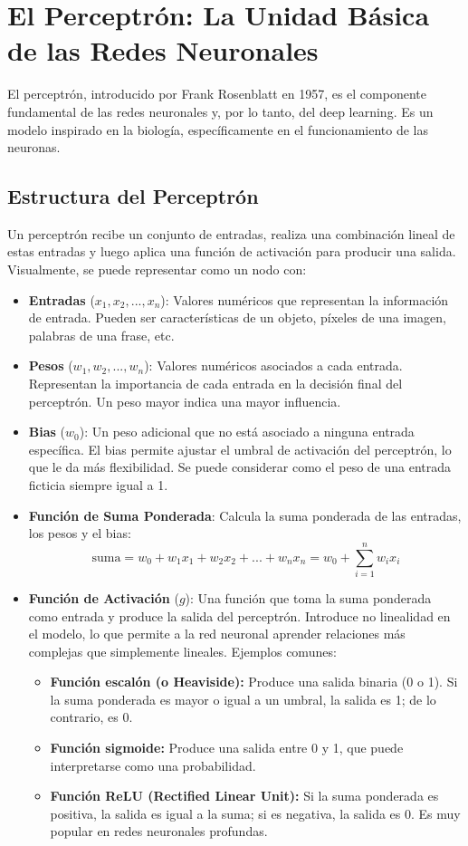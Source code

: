\documentclass{article}
\begin{document}
\section{El Perceptrón: La Unidad Básica de las Redes Neuronales}

El perceptrón, introducido por Frank Rosenblatt en 1957, es el componente fundamental de las redes neuronales y, por lo tanto, del deep learning.  Es un modelo inspirado en la biología, específicamente en el funcionamiento de las neuronas.

\subsection{Estructura del Perceptrón}

Un perceptrón recibe un conjunto de entradas, realiza una combinación lineal de estas entradas y luego aplica una función de activación para producir una salida.  Visualmente, se puede representar como un nodo con:

\begin{itemize}
    \item \textbf{Entradas} (\(x_1, x_2, ..., x_n\)): Valores numéricos que representan la información de entrada.  Pueden ser características de un objeto, píxeles de una imagen, palabras de una frase, etc.
    \item \textbf{Pesos} (\(w_1, w_2, ..., w_n\)): Valores numéricos asociados a cada entrada.  Representan la importancia de cada entrada en la decisión final del perceptrón.  Un peso mayor indica una mayor influencia.
    \item \textbf{Bias} (\(w_0\)): Un peso adicional que no está asociado a ninguna entrada específica.  El bias permite ajustar el umbral de activación del perceptrón, lo que le da más flexibilidad. Se puede considerar como el peso de una entrada ficticia siempre igual a 1.
    \item \textbf{Función de Suma Ponderada}:  Calcula la suma ponderada de las entradas, los pesos y el bias:
    \[
    \text{suma} = w_0 + w_1x_1 + w_2x_2 + ... + w_nx_n = w_0 + \sum_{i=1}^{n} w_i x_i
    \]
    \item \textbf{Función de Activación} (\(g\)):  Una función que toma la suma ponderada como entrada y produce la salida del perceptrón.  Introduce no linealidad en el modelo, lo que permite a la red neuronal aprender relaciones más complejas que simplemente lineales. Ejemplos comunes:
        \begin{itemize}
            \item \textbf{Función escalón (o Heaviside):}  Produce una salida binaria (0 o 1).  Si la suma ponderada es mayor o igual a un umbral, la salida es 1; de lo contrario, es 0.
            \item \textbf{Función sigmoide:}  Produce una salida entre 0 y 1, que puede interpretarse como una probabilidad.
            \item \textbf{Función ReLU (Rectified Linear Unit):}  Si la suma ponderada es positiva, la salida es igual a la suma; si es negativa, la salida es 0.  Es muy popular en redes neuronales profundas.
        \end{itemize}
\end{itemize}
\end{document}
